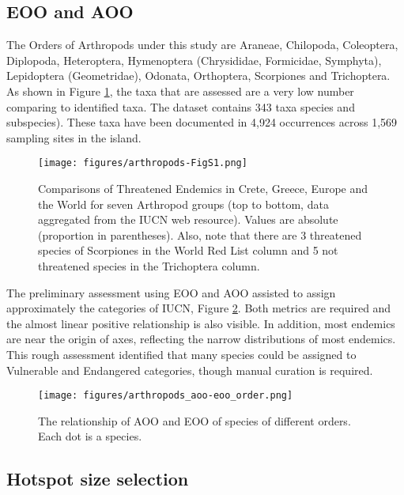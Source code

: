     \subsection{EOO and AOO}
    \label{subsec:arthropods-sampling}

The Orders of Arthropods under this study are Araneae, Chilopoda, Coleoptera,
Diplopoda, Heteroptera, Hymenoptera (Chrysididae, Formicidae, Symphyta),
Lepidoptera (Geometridae), Odonata, Orthoptera, Scorpiones and Trichoptera.
As shown in Figure \ref{fig:arthropods-figS1}, the taxa that are assessed are 
a very low number comparing to identified taxa. The dataset contains 343 taxa species and subspecies).
These taxa have been documented in 4,924 occurrences across 1,569 sampling sites in the island.

   \begin{figure}[htp!]
      \centering
      \texttt{[image: figures/arthropods-FigS1.png]}
      \caption[Comparisons of Threatened Endemics in Crete, Greece, Europe and the World]{Comparisons of Threatened Endemics in Crete, Greece, Europe and the World for seven Arthropod groups (top to bottom, data aggregated from the IUCN web resource). Values are absolute (proportion in parentheses). Also, note that there are 3 threatened species of Scorpiones in the World Red List column and 5 not threatened species in the Trichoptera column.}
      \label{fig:arthropods-figS1}
   \end{figure}

The preliminary assessment using EOO and AOO assisted to assign approximately the 
categories of IUCN, Figure \ref{fig:arthropods-eoo-aoo}.
Both metrics are required and the almost linear positive relationship is also visible. 
In addition, most endemics are near the origin of axes, reflecting the narrow 
distributions of most endemics.
This rough assessment 
identified that many species could be assigned to Vulnerable and Endangered categories, though 
manual curation is required. 

   \begin{figure}[htb!]
      \centering
      \texttt{[image: figures/arthropods\_aoo-eoo\_order.png]}
      \caption[AOO, EOO relationship per order]{The relationship of AOO and EOO of species of different orders. Each dot is a species. }
      \label{fig:arthropods-eoo-aoo}
   \end{figure}


    \subsection{Hotspot size selection}
    \label{subsec:arthropods-grids}

